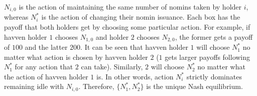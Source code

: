 \noindent $N_{i,0}$ is the action of maintaining the same number of nomins taken by holder $i$, whereas $N_i^*$ is the action of changing their nomin issuance. Each box has the payoff that both holders get by choosing some particular action. For example, if havven holder $1$ chooses $N_{1,0}$ and holder $2$ chooses $N_{2,0}$, the former gets a payoff of $100$ and the latter $200$. It can be seen that havven holder $1$ will choose $N_{1}^*$ no matter what action is chosen by havven holder $2$ ($1$ gets larger payoffs following $N_{1}^*$ for any action that $2$ can take). Similarly, $2$ will choose $N_{2}^*$ no matter what the action of havven holder $1$ is. In other words, action $N_i^*$ strictly dominates remaining idle with $N_{i,0}$. Therefore, $\{N_1^*,N_2^*\}$ is the unique Nash equilibrium. \\